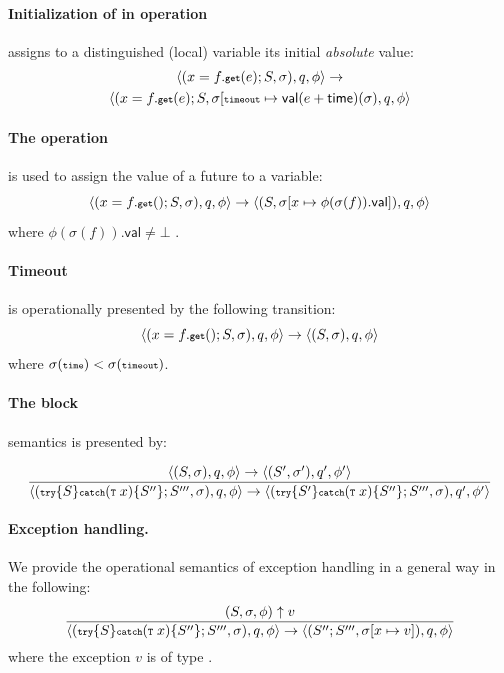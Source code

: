 \paragraph*{Initialization of  in \gett  \space operation} 
assigns to a  distinguished (local) variable  its initial \emph{absolute} value:
\begin{multline*} \langle  (x=f.{\textnormal{\textbf{{\scriptsize\texttt{get}}}}}(e); S, \sigma), q, \phi\rangle \rightarrow  \\
 \langle (x=f.{\textnormal{\textbf{{\scriptsize\texttt{get}}}}}(e);S, \sigma [{\scriptsize\texttt{timeout}} \mapsto \textsf{val}(e+\mathsf{time})(\sigma), q, \phi\rangle 
\end{multline*}


\paragraph*{The \gett \space operation} is used to assign the value of a future to a variable:
$$ \langle  (x=f.{\textnormal{\textbf{{\scriptsize\texttt{get}}}}}(); S, \sigma), q, \phi\rangle \rightarrow \langle (S, \sigma [x \mapsto \phi(\sigma(f)).\mathsf{val}]), q, \phi\rangle $$
where $ \phi(\sigma(f)).\mathsf{val} \neq \bot$ .

\paragraph*{Timeout} is operationally presented by the following transition:
$$ \langle  (x=f.{\textnormal{\textbf{{\scriptsize\texttt{get}}}}}(); S, \sigma), q, \phi\rangle \rightarrow \langle (S, \sigma), q, \phi\rangle $$
where $\sigma({\scriptsize\texttt{time}})< \sigma({\scriptsize\texttt{timeout}})$.

\paragraph*{The \textnormal{\textbf{}} block} semantics is presented by: 

$$ 
\frac
{\langle (S,\sigma),q, \phi\rangle \rightarrow \langle (S', \sigma'), q', \phi'\rangle}
{\langle ({\scriptsize\texttt{try}}\{ S \}{\scriptsize\texttt{catch}}({\scriptsize\texttt{T}} \; x)\{S''\};S''', \sigma), q, \phi\rangle \rightarrow \langle ({\scriptsize\texttt{try}}\{ S' \}{\scriptsize\texttt{catch}}({\scriptsize\texttt{T}} \; x)\{S''\};S''', \sigma), q', \phi'\rangle}
$$ 

\paragraph*{Exception handling.} 
We provide the operational semantics of exception handling in a general way in the following:
$$
\frac
{(S,\sigma,\phi) \uparrow v}
{\langle ({\scriptsize\texttt{try}}\{ S \}{\scriptsize\texttt{catch}}({\scriptsize\texttt{T}} \; x)\{S''\};S''', \sigma), q, \phi\rangle \rightarrow \langle  (S'';S''', \sigma[x\mapsto v]), q, \phi\rangle}
$$
where the exception $v$ is  of type .

